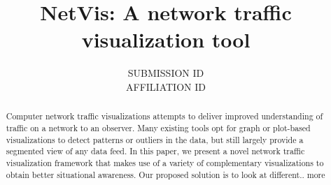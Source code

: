 
\title[NetVis: A network traffic visualization tool] %
      {NetVis: A network traffic visualization tool}

\author[SUBMISSION ID] %
       {SUBMISSION ID \\
         AFFILIATION ID
       }

%



\maketitle

\begin{abstract}
Computer network traffic visualizations attempts to deliver improved understanding of traffic on a network to an observer. 
Many existing tools opt for graph or plot-based visualizations to detect patterns or outliers in the data, but still largely
provide a segmented view of any data feed. In this paper, we present a novel network traffic visualization framework that 
makes use of a variety of complementary visualizations to obtain better situational awareness. 
Our proposed solution is to look at different.. {\color{red}more}

\begin{classification} %
\end{classification}

\end{abstract}


